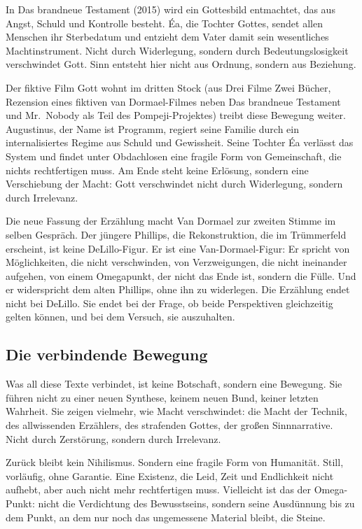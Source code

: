 \documentclass[
  ngerman,
]{article}
\begin{document}
In Das brandneue Testament (2015) wird ein Gottesbild entmachtet, das
aus Angst, Schuld und Kontrolle besteht. Éa, die Tochter Gottes, sendet
allen Menschen ihr Sterbedatum und entzieht dem Vater damit sein
wesentliches Machtinstrument. Nicht durch Widerlegung, sondern durch
Bedeutungslosigkeit verschwindet Gott. Sinn entsteht hier nicht aus
Ordnung, sondern aus Beziehung.

Der fiktive Film Gott wohnt im dritten Stock (aus Drei Filme Zwei
Bücher, Rezension eines fiktiven van Dormael-Filmes neben Das brandneue
Testament und Mr.~Nobody als Teil des Pompeji-Projektes) treibt diese
Bewegung weiter. Augustinus, der Name ist Programm, regiert seine
Familie durch ein internalisiertes Regime aus Schuld und Gewissheit.
Seine Tochter Éa verlässt das System und findet unter Obdachlosen eine
fragile Form von Gemeinschaft, die nichts rechtfertigen muss. Am Ende
steht keine Erlösung, sondern eine Verschiebung der Macht: Gott
verschwindet nicht durch Widerlegung, sondern durch Irrelevanz.

Die neue Fassung der Erzählung macht Van Dormael zur zweiten Stimme im
selben Gespräch. Der jüngere Phillips, die Rekonstruktion, die im
Trümmerfeld erscheint, ist keine DeLillo-Figur. Er ist eine
Van-Dormael-Figur: Er spricht von Möglichkeiten, die nicht verschwinden,
von Verzweigungen, die nicht ineinander aufgehen, von einem Omegapunkt,
der nicht das Ende ist, sondern die Fülle. Und er widerspricht dem alten
Phillips, ohne ihn zu widerlegen. Die Erzählung endet nicht bei DeLillo.
Sie endet bei der Frage, ob beide Perspektiven gleichzeitig gelten
können, und bei dem Versuch, sie auszuhalten.

\subsection{Die verbindende Bewegung}\label{die-verbindende-bewegung}

Was all diese Texte verbindet, ist keine Botschaft, sondern eine
Bewegung. Sie führen nicht zu einer neuen Synthese, keinem neuen Bund,
keiner letzten Wahrheit. Sie zeigen vielmehr, wie Macht verschwindet:
die Macht der Technik, des allwissenden Erzählers, des strafenden
Gottes, der großen Sinnnarrative. Nicht durch Zerstörung, sondern durch
Irrelevanz.

Zurück bleibt kein Nihilismus. Sondern eine fragile Form von Humanität.
Still, vorläufig, ohne Garantie. Eine Existenz, die Leid, Zeit und
Endlichkeit nicht aufhebt, aber auch nicht mehr rechtfertigen muss.
Vielleicht ist das der Omega-Punkt: nicht die Verdichtung des
Bewusstseins, sondern seine Ausdünnung bis zu dem Punkt, an dem nur noch
das ungemessene Material bleibt, die Steine.
\end{document}
